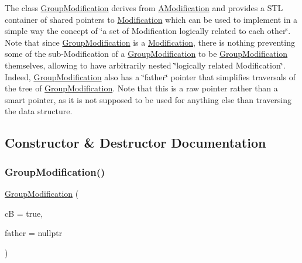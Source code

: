 The class \mbox{\hyperlink{class_s_m_spp__di__unipi__it_1_1_group_modification}{Group\+Modification}} derives from \mbox{\hyperlink{class_s_m_spp__di__unipi__it_1_1_a_modification}{A\+Modification}} and provides a S\+TL container of shared pointers to \mbox{\hyperlink{class_s_m_spp__di__unipi__it_1_1_modification}{Modification}} which can be used to implement in a simple way the concept of \char`\"{}a set of Modification logically
related to each other\char`\"{}. Note that since \mbox{\hyperlink{class_s_m_spp__di__unipi__it_1_1_group_modification}{Group\+Modification}} is a \mbox{\hyperlink{class_s_m_spp__di__unipi__it_1_1_modification}{Modification}}, there is nothing preventing some of the sub-\/\+Modification of a \mbox{\hyperlink{class_s_m_spp__di__unipi__it_1_1_group_modification}{Group\+Modification}} to be \mbox{\hyperlink{class_s_m_spp__di__unipi__it_1_1_group_modification}{Group\+Modification}} themselves, allowing to have arbitrarily nested \char`\"{}logically related Modification\char`\"{}. Indeed, \mbox{\hyperlink{class_s_m_spp__di__unipi__it_1_1_group_modification}{Group\+Modification}} also has a \char`\"{}father\char`\"{} pointer that simplifies traversals of the tree of \mbox{\hyperlink{class_s_m_spp__di__unipi__it_1_1_group_modification}{Group\+Modification}}. Note that this is a raw pointer rather than a smart pointer, as it is not supposed to be used for anything else than traversing the data structure. 

\subsection{Constructor \& Destructor Documentation}
\mbox{\label{class_s_m_spp__di__unipi__it_1_1_group_modification_aba0f518d7a36aeeb3dfc84382fc89950}} 
\subsubsection{\texorpdfstring{Group\+Modification()}{GroupModification()}}
{\footnotesize\ttfamily \mbox{\hyperlink{class_s_m_spp__di__unipi__it_1_1_group_modification}{Group\+Modification}} (\begin{DoxyParamCaption}\item[{const bool}]{cB = {\ttfamily true},  }\item[{\mbox{\hyperlink{class_s_m_spp__di__unipi__it_1_1_group_modification}{Group\+Modification}} $\ast$}]{father = {\ttfamily nullptr} }\end{DoxyParamCaption})\hspace{0.3cm}{\ttfamily [inline]}}



